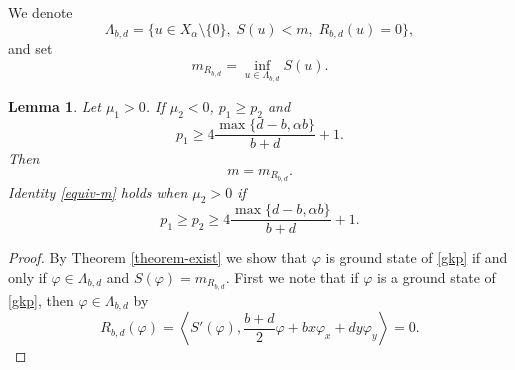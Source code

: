 \documentclass[10pt]{article}
\numberwithin{equation}{section}
\newtheorem{lemma}[theorem]{\quad Lemma}
\newcommand{\ff}{\varphi}
\newcommand{\la}{\langle}
\newcommand{\ra}{\rangle}
\newcommand{\x}{{X_\alpha}}
\newcommand{\moo}{\mu_2}  \newcommand{\poo}{{p_2}}
\newcommand{\al}{\alpha}
\newcommand{\rrr}{{R_{b,d}}}
\begin{document}
	We denote 
	\[
	\Lambda_{b,d}=\{u\in\x\setminus\{0\},\;S(u)<m,\;\rrr(u)=0\},
	\]
	and set
	\[
	m_\rrr=\inf_{u\in\Lambda_{b,d}} S(u).
	\]
	\begin{lemma}\label{equiv-vari-1}
		Let $\mu_1>0$.	If $\moo<0$, $p_1\geq p_2$ and
		\[
		p_1\geq4\frac{\max\{d-b,\al b\}}{b+d}+1.
		\]
		Then 
		\begin{equation}\label{equiv-m}
			m=m_\rrr.
		\end{equation}
		Identity \eqref{equiv-m} holds when $\mu_2>0$ if   
		\[
		p_1\geq p_2\geq4\frac{\max\{d-b,\al b\}}{b+d}+1.
		\]
	\end{lemma} 
	\begin{proof}
		By Theorem \ref{theorem-exist} we show that $\ff$ is ground state of \eqref{gkp} if and only if $\ff\in\Lambda_{b,d}$ and $S(\ff)=m_{\rrr}$. First we note that if $\ff$ is a ground state of \eqref{gkp}, then $\ff\in\Lambda_{b,d}$ by 
		\begin{equation}\label{id}
			\rrr(\ff)=\left\la S'(\ff), \frac{b+d}{2}\ff+bx\ff_x+dy\ff_y\right \ra=0.
		\end{equation}
		

\end{proof}
\end{document}
